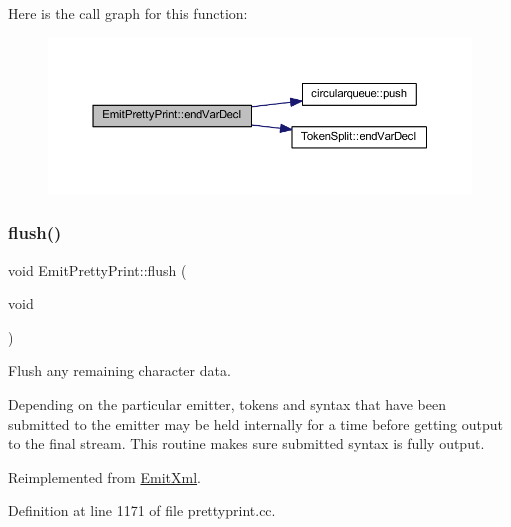 Here is the call graph for this function\+:
\nopagebreak
\begin{figure}[H]
\begin{center}
\leavevmode
\includegraphics[width=350pt]{class_emit_pretty_print_a468af036c0623c76311ea4d286940936_cgraph}
\end{center}
\end{figure}
\mbox{\label{class_emit_pretty_print_a4537a56174d63dfc806c8b599181723b}} 
\subsubsection{\texorpdfstring{flush()}{flush()}}
{\footnotesize\ttfamily void Emit\+Pretty\+Print\+::flush (\begin{DoxyParamCaption}\item[{void}]{ }\end{DoxyParamCaption})\hspace{0.3cm}{\ttfamily [virtual]}}



Flush any remaining character data. 

Depending on the particular emitter, tokens and syntax that have been submitted to the emitter may be held internally for a time before getting output to the final stream. This routine makes sure submitted syntax is fully output. 

Reimplemented from \mbox{\hyperlink{class_emit_xml_a4266748416715606d0028e2aec90dce8}{Emit\+Xml}}.



Definition at line 1171 of file prettyprint.\+cc.

